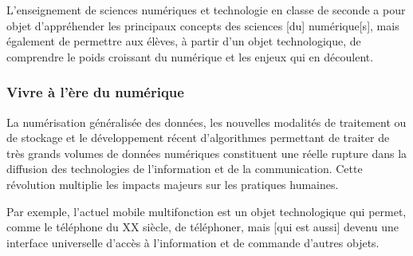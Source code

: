 L’enseignement de sciences numériques et technologie en classe de seconde a pour objet d’appréhender les principaux concepts des sciences [du] numérique[s], mais également de permettre aux élèves, à partir d’un objet technologique, de comprendre le poids croissant du numérique et les enjeux qui en découlent.

\vspace{1.2\baselineskip}
\subsubsection*{Vivre à l'ère du numérique}

La numérisation généralisée des données, les nouvelles modalités de traitement ou de stockage et le développement récent d’algorithmes permettant de traiter de très grands volumes de données numériques constituent une réelle rupture dans la diffusion des technologies de l’information et de la communication. Cette révolution multiplie les impacts majeurs sur les pratiques humaines.

Par exemple, l’actuel mobile multifonction est un objet technologique qui permet, comme le téléphone du XX siècle, de téléphoner, mais [qui est aussi] devenu une interface universelle d’accès à l’information et de commande d’autres objets.

